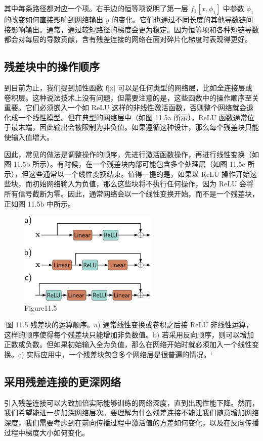 其中每条路径都对应一个项。右手边的恒等项说明了第一层 \(f_1[x, \phi_1]\) 中参数 \(\phi_1\) 的改变如何直接影响到网络输出 \(y\) 的变化。它们也通过不同长度的其他导数链间接影响输出。通常，通过较短路径的梯度会更为稳定。因为恒等项和各种短链导数都会对每层的导数贡献，含有残差连接的网络在面对碎片化梯度时表现得更好。

\subsection{残差块中的操作顺序}
到目前为止，我们提到加性函数 f[x] 可以是任何类型的网络层，比如全连接层或卷积层。这种说法技术上没有问题，但需要注意的是，这些函数中的操作顺序至关重要。它们必须嵌入一个如 ReLU 这样的非线性激活函数，否则整个网络就会退化成一个线性模型。但在典型的网络层中（如图 11.5a 所示），ReLU 函数通常位于最末端，因此输出会被限制为非负值。如果遵循这种设计，那么每个残差块只能使输入值增大。

因此，常见的做法是调整操作的顺序，先进行激活函数操作，再进行线性变换（如图 11.5b 所示）。有时候，在一个残差块内部可能包含多个处理层（如图 11.5c 所示），但这些通常以一个线性变换结束。值得一提的是，如果以 ReLU 操作开始这些块，而初始网络输入为负值，那么这些块将不执行任何操作，因为 ReLU 会将所有信号截断为零。因此，通常网络会以一个线性变换开始，而不是一个残差块，正如图 11.5b 中所示。

\begin{figure}[h!]
\centering
\includegraphics[width=0.7\linewidth]{png/chapter11/ResidualOrder.png}
\caption{Figure11.5}
\end{figure}

`图 11.5 残差块的运算顺序。a) 通常线性变换或卷积之后接 ReLU 非线性运算，这样的顺序使得每个残差块只能增加非负数值。b) 若采用反向顺序，则可以增加正数或负数。但如果初始输入全为负值，那么在网络开始时就必须加入一个线性变换。c) 实际应用中，一个残差块包含多个网络层是很普遍的情况。`

\subsection{采用残差连接的更深网络}
引入残差连接可以大致加倍实际能够训练的网络深度，直到出现性能下降。然而，我们希望能进一步加深网络层次。要理解为什么残差连接不能让我们随意增加网络深度，我们需要考虑到在前向传播过程中激活值的方差如何变化，以及在反向传播过程中梯度大小如何变化。

